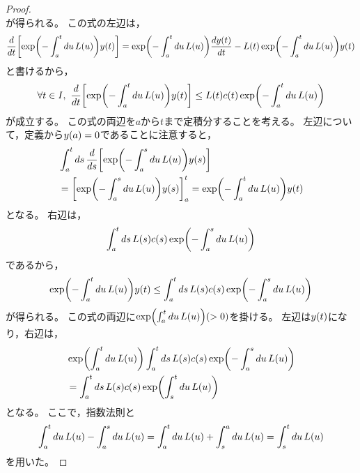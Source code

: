 \documentclass[b5paper,draft,oneside,openany]{ltjsbook} %
\begin{document}
\begin{thm}
\begin{proof}
\begin{equation}
        \end{equation}
        が得られる。
        この式の左辺は，
        \begin{equation}
            \diff{}{t}\squ{\fun{\exp}{-\int_a^t du\, \fun{L}{u}} \fun{y}{t}}
            =\fun{\exp}{-\int_a^t du\, \fun{L}{u}}\diff{\fun{y}{t}}{t}
            -\fun{L}{t}\fun{\exp}{-\int_a^t du\, \fun{L}{u}}\fun{y}{t}
        \end{equation}
        と書けるから，
        \begin{equation}
            \forall t\in I,\ \diff{}{t}\squ{\fun{\exp}{-\int_a^t du\, \fun{L}{u}} \fun{y}{t}}
            \leq \fun{L}{t}\fun{c}{t}\fun{\exp}{-\int_a^t du\, \fun{L}{u}}
        \end{equation}
        が成立する。
        この式の両辺を$a$から$t$まで定積分することを考える。
        左辺について，定義から$\fun{y}{a}=0$であることに注意すると，
        \begin{align}
            &\int_a^t ds\, \diff{}{s}\squ{\fun{\exp}{-\int_a^s du\, \fun{L}{u}} \fun{y}{s}}
            \\
            &=\squ{\fun{\exp}{-\int_a^s du\, \fun{L}{u}} \fun{y}{s}}_a^t
            =\fun{\exp}{-\int_a^t du\, \fun{L}{u}} \fun{y}{t}
        \end{align}
        となる。
        右辺は，
        \begin{equation}
            \int_a^t ds\, \fun{L}{s}\fun{c}{s}\fun{\exp}{-\int_a^s du\, \fun{L}{u}}
        \end{equation}
        であるから，
        \begin{equation}
            \fun{\exp}{-\int_a^t du\, \fun{L}{u}} \fun{y}{t}\leq 
            \int_a^t ds\, \fun{L}{s}\fun{c}{s}\fun{\exp}{-\int_a^s du\, \fun{L}{u}}
        \end{equation}
        が得られる。
        この式の両辺に$\fun{\exp}{\int_a^t du\, \fun{L}{u}}(>0)$を掛ける。
        左辺は$\fun{y}{t}$になり，右辺は，
        \begin{align}
            &\fun{\exp}{\int_a^t du\, \fun{L}{u}} \int_a^t ds\, \fun{L}{s}\fun{c}{s}\fun{\exp}{-\int_a^s du\, \fun{L}{u}}
            \\
            &=\int_a^t ds\, \fun{L}{s}\fun{c}{s}\fun{\exp}{\int_s^t du\, \fun{L}{u}}
        \end{align}
        となる。
        ここで，指数法則と
        \begin{equation}
            \int_a^t du\, \fun{L}{u}-\int_a^s du\, \fun{L}{u}
            =\int_a^t du\, \fun{L}{u}+\int_s^a du\, \fun{L}{u}
            =\int_s^t du\, \fun{L}{u}
        \end{equation}
        を用いた。


\end{proof}
\end{thm}
\end{document}
